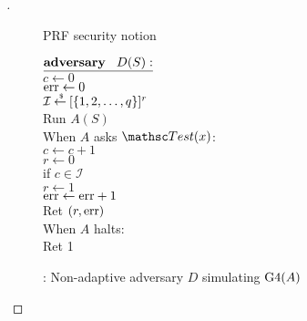 \begin{proof}[]
\begin{figure}
\centering
{}
\caption{PRF security notion}\label{fig:prf}
\end{figure}


\begin{figure}
\centering
{}
{
${\underline{\textbf{adversary}\hspace*{2ex} {D(S)}:}}$\\[4pt]
$c \gets 0$\\%
$\mathrm{err} \gets 0$\\
$\mathcal{I}{\:\stackrel{{\scriptscriptstyle \hspace{0.2em}\$}} {\leftarrow}\:} [\{1,2,\ldots,q\}]^r$\\
Run $A(S)$\\
When $A$ asks $\Test(x)$:\\
\nudge $c \gets c+1$\\
\nudge $r \gets 0$\\
\nudge if $c \in \mathcal{I}$\\
\nudge \nudge $r \gets 1$\\
\nudge \nudge $\mathrm{err} \gets \mathrm{err} + 1$\\
\nudge Ret $(r,\mathrm{err} )$\\
When $A$ halts:\\
\nudge Ret 1
}
\caption{: Non-adaptive adversary $D$ simulating $\text{G4}(A)$} \label{fig:D}
\end{figure}	

\end{proof}

